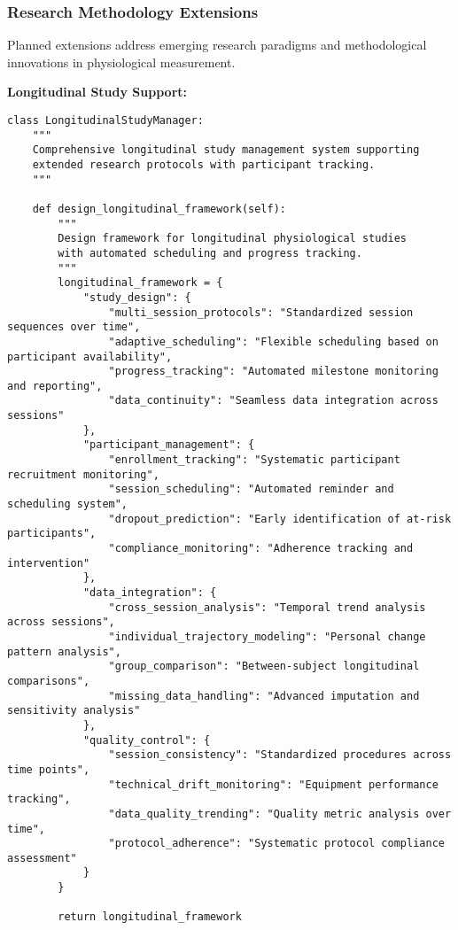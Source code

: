 \documentclass[12pt,a4paper]{article}
\begin{document}
\subsubsection{Research Methodology Extensions}

Planned extensions address emerging research paradigms and methodological innovations in physiological measurement.

\textbf{Longitudinal Study Support:}

\begin{verbatim}
class LongitudinalStudyManager:
    """
    Comprehensive longitudinal study management system supporting
    extended research protocols with participant tracking.
    """
    
    def design_longitudinal_framework(self):
        """
        Design framework for longitudinal physiological studies
        with automated scheduling and progress tracking.
        """
        longitudinal_framework = {
            "study_design": {
                "multi_session_protocols": "Standardized session sequences over time",
                "adaptive_scheduling": "Flexible scheduling based on participant availability",
                "progress_tracking": "Automated milestone monitoring and reporting",
                "data_continuity": "Seamless data integration across sessions"
            },
            "participant_management": {
                "enrollment_tracking": "Systematic participant recruitment monitoring",
                "session_scheduling": "Automated reminder and scheduling system",
                "dropout_prediction": "Early identification of at-risk participants",
                "compliance_monitoring": "Adherence tracking and intervention"
            },
            "data_integration": {
                "cross_session_analysis": "Temporal trend analysis across sessions",
                "individual_trajectory_modeling": "Personal change pattern analysis",
                "group_comparison": "Between-subject longitudinal comparisons",
                "missing_data_handling": "Advanced imputation and sensitivity analysis"
            },
            "quality_control": {
                "session_consistency": "Standardized procedures across time points",
                "technical_drift_monitoring": "Equipment performance tracking",
                "data_quality_trending": "Quality metric analysis over time",
                "protocol_adherence": "Systematic protocol compliance assessment"
            }
        }
        
        return longitudinal_framework
\end{verbatim}
\end{document}
